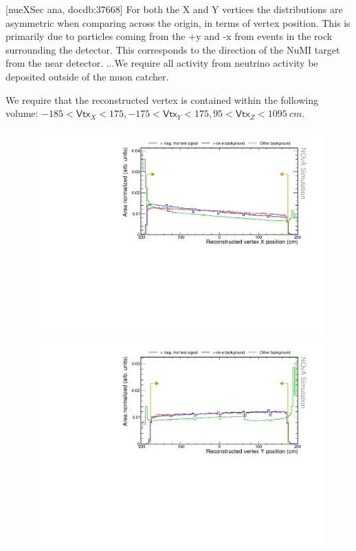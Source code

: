 [nueXSec ana, docdb:37668] For both the X and Y vertices the distributions are asymmetric when comparing across the origin, in terms of vertex position. This is primarily due to particles coming from the +y and -x from events in the rock surrounding the detector. This corresponds to the direction of the NuMI target from the near detector. ...We require all activity from neutrino activity be deposited outside of the muon catcher.

We require that the reconstructed vertex is contained within the following volume: $-185<\textsf{Vtx}_X<175,-175<\textsf{Vtx}_Y<175, 95<\textsf{Vtx}_Z<1095\ \unit{cm}$.

\begin{figure}[hbtp]
\centering
\includegraphics[width=.9\textwidth]{Plots/NuMMEventSelection/NoCut_vtxX.pdf}
\includegraphics[width=.9\textwidth]{Plots/NuMMEventSelection/NoCut_vtxY.pdf}

\end{figure}
